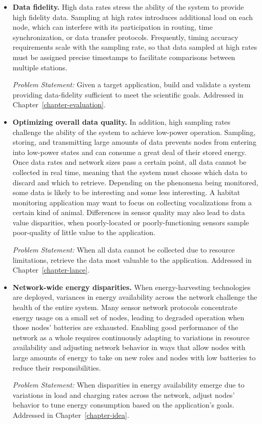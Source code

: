 \begin{itemize}

\item \textbf{Data fidelity.} High data rates stress the ability of the
system to provide high fidelity data. Sampling at high rates introduces
additional load on each node, which can interfere with its participation in
routing, time synchronization, or data transfer protocols. Frequently, timing
accuracy requirements scale with the sampling rate, so that data sampled at
high rates must be assigned precise timestamps to facilitate comparisons
between multiple stations.

\textit{Problem Statement:} Given a target application, build and validate a
system providing data-fidelity sufficient to meet the scientific goals.
Addressed in Chapter~\ref{chapter-evaluation}.

\item \textbf{Optimizing overall data quality.} In addition, high sampling
rates challenge the ability of the system to achieve low-power operation.
Sampling, storing, and transmitting large amounts of data prevents nodes from
entering into low-power states and can consume a great deal of their stored
energy. Once data rates and network sizes pass a certain point, all data
cannot be collected in real time, meaning that the system must choose which
data to discard and which to retrieve. Depending on the phenomena being
monitored, some data is likely to be interesting and some less interesting. A
habitat monitoring application may want to focus on collecting vocalizations
from a certain kind of animal. Differences in sensor quality may also lead to
data value disparities, when poorly-located or poorly-functioning sensors
sample poor-quality of little value to the application.

\textit{Problem Statement:} When all data cannot be collected due to resource
limitations, retrieve the data most valuable to the application. Addressed in
Chapter~\ref{chapter-lance}.

\item \textbf{Network-wide energy disparities.} When energy-harvesting
technologies are deployed, variances in energy availability across the
network challenge the health of the entire system. Many sensor network
protocols concentrate energy usage on a small set of nodes, leading to
degraded operation when those nodes' batteries are exhausted. Enabling good
performance of the network as a whole requires continuously adapting to
variations in resource availability and adjusting network behavior in ways
that allow nodes with large amounts of energy to take on new roles and nodes
with low batteries to reduce their responsibilities.

\textit{Problem Statement:} When disparities in energy availability emerge
due to variations in load and charging rates across the network, adjust
nodes' behavior to tune energy consumption based on the application's goals.
Addressed in Chapter~\ref{chapter-idea}.

\end{itemize}

